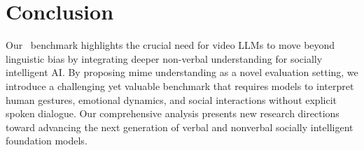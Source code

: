 
\section{Conclusion}

Our \data\ benchmark highlights the crucial need for video LLMs to move beyond linguistic bias by integrating deeper non-verbal understanding for socially intelligent AI. By proposing mime understanding as a novel evaluation setting, we introduce a challenging yet valuable benchmark that requires models to interpret human gestures, emotional dynamics, and social interactions without explicit spoken dialogue. Our comprehensive analysis presents new research directions toward advancing the next generation of verbal and nonverbal socially intelligent foundation models.